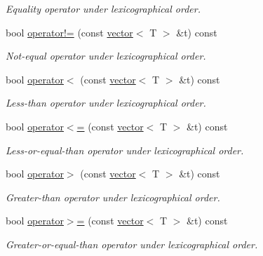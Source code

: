 \begin{DoxyCompactItemize}
\begin{DoxyCompactList}\small\item\em Equality operator under lexicographical order. \end{DoxyCompactList}\item 
bool \hyperlink{classmerlin_1_1vector_a94d39609027858a133eea259ea1818ce}{operator!=} (const \hyperlink{classmerlin_1_1vector}{vector}$<$ T $>$ \&t) const \hypertarget{classmerlin_1_1vector_a94d39609027858a133eea259ea1818ce}{}\label{classmerlin_1_1vector_a94d39609027858a133eea259ea1818ce}

\begin{DoxyCompactList}\small\item\em Not-\/equal operator under lexicographical order. \end{DoxyCompactList}\item 
bool \hyperlink{classmerlin_1_1vector_a183cae0303276e9c310ce383fa67a126}{operator$<$} (const \hyperlink{classmerlin_1_1vector}{vector}$<$ T $>$ \&t) const \hypertarget{classmerlin_1_1vector_a183cae0303276e9c310ce383fa67a126}{}\label{classmerlin_1_1vector_a183cae0303276e9c310ce383fa67a126}

\begin{DoxyCompactList}\small\item\em Less-\/than operator under lexicographical order. \end{DoxyCompactList}\item 
bool \hyperlink{classmerlin_1_1vector_a0bf2c3e70321a5ed17036762513afebd}{operator$<$=} (const \hyperlink{classmerlin_1_1vector}{vector}$<$ T $>$ \&t) const \hypertarget{classmerlin_1_1vector_a0bf2c3e70321a5ed17036762513afebd}{}\label{classmerlin_1_1vector_a0bf2c3e70321a5ed17036762513afebd}

\begin{DoxyCompactList}\small\item\em Less-\/or-\/equal-\/than operator under lexicographical order. \end{DoxyCompactList}\item 
bool \hyperlink{classmerlin_1_1vector_a064996c92138178f03fd9147cd382122}{operator$>$} (const \hyperlink{classmerlin_1_1vector}{vector}$<$ T $>$ \&t) const \hypertarget{classmerlin_1_1vector_a064996c92138178f03fd9147cd382122}{}\label{classmerlin_1_1vector_a064996c92138178f03fd9147cd382122}

\begin{DoxyCompactList}\small\item\em Greater-\/than operator under lexicographical order. \end{DoxyCompactList}\item 
bool \hyperlink{classmerlin_1_1vector_a83dbba1136d7ed0af355b01b89de8d65}{operator$>$=} (const \hyperlink{classmerlin_1_1vector}{vector}$<$ T $>$ \&t) const \hypertarget{classmerlin_1_1vector_a83dbba1136d7ed0af355b01b89de8d65}{}\label{classmerlin_1_1vector_a83dbba1136d7ed0af355b01b89de8d65}

\begin{DoxyCompactList}\small\item\em Greater-\/or-\/equal-\/than operator under lexicographical order. \end{DoxyCompactList}\end{DoxyCompactItemize}
